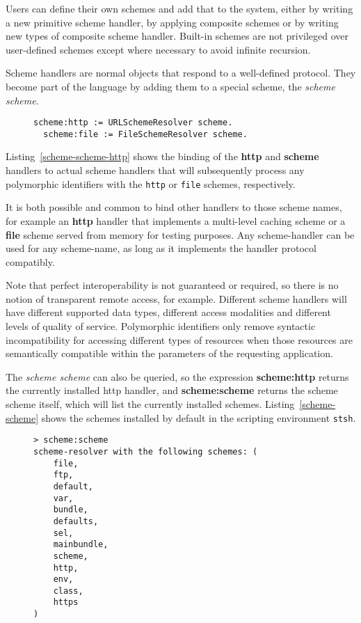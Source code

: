\documentclass[preprint,authoryear]{acm_proc_article-sp}
\begin{document}
Users can define their own schemes and add that 
to the system, either by writing
a new primitive scheme handler, by applying composite schemes or by writing new types
of composite scheme handler.  Built-in schemes are not privileged over user-defined
schemes except where necessary to avoid infinite recursion.

Scheme handlers are normal objects that respond to a well-defined protocol.  They
become part of the language by adding them to a special scheme, the {\em scheme scheme}.

\begin{figure}[htbp]
\begin{lstlisting}[style=L,label=scheme-scheme-http,caption=Adding the http and file schemes.]
  scheme:http := URLSchemeResolver scheme.
  scheme:file := FileSchemeResolver scheme.
\end{lstlisting}
\end{figure}

Listing~\ref{scheme-scheme-http} shows the binding of the {\bf http} and {\bf scheme}
handlers to actual scheme handlers that will subsequently process any polymorphic
identifiers with the {\tt http} or {\tt file} schemes, respectively. 

It is both possible and common to bind other handlers to those scheme
names, for example an {\bf http} handler that implements a multi-level caching scheme
or a {\bf file} scheme served from memory for testing purposes.  Any scheme-handler
can be used for any scheme-name, as long as it implements the handler protocol
compatibly.

Note that perfect interoperability is not guaranteed or required, so there is no notion
of transparent remote access, for example.  Different scheme handlers will have different supported
data types, different access modalities and different levels of quality of service.
Polymorphic identifiers only remove syntactic incompatibility for accessing different types
of resources when those resources are semantically compatible within the parameters
of the requesting application.


The {\em scheme scheme} can also be queried,
so the expression {\bf scheme:http} returns the currently installed http handler, and 
{\bf scheme:scheme} returns the scheme scheme itself, which will list the currently
installed schemes.  Listing~\ref{scheme-scheme} shows the schemes installed by
default in the scripting environment {\tt stsh}.

\begin{figure}[htbp]
\begin{lstlisting}[style=L,label=scheme-scheme,caption=List of schemes via scheme:scheme.]
> scheme:scheme 
scheme-resolver with the following schemes: (
    file,
    ftp,
    default,
    var,
    bundle,
    defaults,
    sel,
    mainbundle,
    scheme,
    http,
    env,
    class,
    https
)
\end{lstlisting}
\end{figure}
\end{document}
